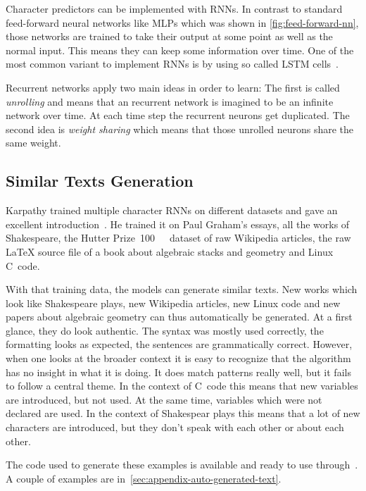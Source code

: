 \documentclass[technote,a4paper,leqno]{IEEEtran}
\begin{document}
Character predictors can be implemented with \glspl{RNN}. In contrast to
standard feed-forward neural networks like \glspl{MLP} which was shown in
\cref{fig:feed-forward-nn}, those networks are trained to take their output at
some point as well as the normal input. This means they can keep some
information over time. One of the most common variant to implement \glspl{RNN}
is by using so called \gls{LSTM} cells~\cite{hochreiter1997long}.

Recurrent networks apply two main ideas in order to learn: The first is called
\textit{unrolling} and means that an recurrent network is imagined to be
an infinite network over time. At each time step the recurrent neurons get
duplicated. The second idea is \textit{weight sharing} which means that those
unrolled neurons share the same weight.

\subsection{Similar Texts Generation}
Karpathy trained multiple character \glspl{RNN} on different datasets and gave
an excellent introduction~\cite{Karpathy2015}. He trained it on Paul Graham's
essays, all the works of Shakespeare, the Hutter Prize~\cite{hutterPrize}\SI{100}{\mega\byte}~dataset of raw Wikipedia articles, the raw \LaTeX{} source
file of a book about algebraic stacks and geometry and Linux C~code.

With that training data, the models can generate similar texts. New works which
look like Shakespeare plays, new Wikipedia articles, new Linux code and new
papers about algebraic geometry can thus automatically be generated. At a first
glance, they do look authentic. The syntax was mostly used correctly, the
formatting looks as expected, the sentences are grammatically correct. However,
when one looks at the broader context it is easy to recognize that the
algorithm has no insight in what it is doing. It does match patterns really
well, but it fails to follow a central theme. In the context of C~code this
means that new variables are introduced, but not used. At the same time,
variables which were not declared are used. In the context of Shakespear plays
this means that a lot of new characters are introduced, but they don't speak
with each other or about each other.

The code used to generate these examples is available and ready to use
through~\cite{charRNNgithub}. A couple of examples are
in~\cref{sec:appendix-auto-generated-text}.
\end{document}

